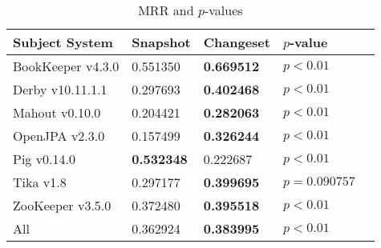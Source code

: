 \begin{table}[t]
\renewcommand{\arraystretch}{1.3}
\footnotesize
\centering
\caption{MRR and $p$-values}
\begin{tabular}{l|ll|ll}
\toprule
Subject System & Snapshot & Changeset & $p$-value  \\
\midrule
BookKeeper v4.3.0 & 0.551350 & {\bf 0.669512 } & $p < 0.01$ \\
Derby v10.11.1.1 & 0.297693 & {\bf 0.402468 } & $p < 0.01$ \\
Mahout v0.10.0 & 0.204421 & {\bf 0.282063 } & $p < 0.01$ \\
OpenJPA v2.3.0 & 0.157499 & {\bf 0.326244 } & $p < 0.01$ \\
Pig v0.14.0 & {\bf 0.532348 } & 0.222687 & $p < 0.01$ \\
Tika v1.8 & 0.297177 & {\bf 0.399695 } & $p = 0.090757$ \\
ZooKeeper v3.5.0 & 0.372480 & {\bf 0.395518 } & $p < 0.01$ \\
\midrule
All & 0.362924 & {\bf 0.383995 } & $p < 0.01$ \\
\bottomrule
\end{tabular}
\label{table:rq1:class:lda}
\end{table}

